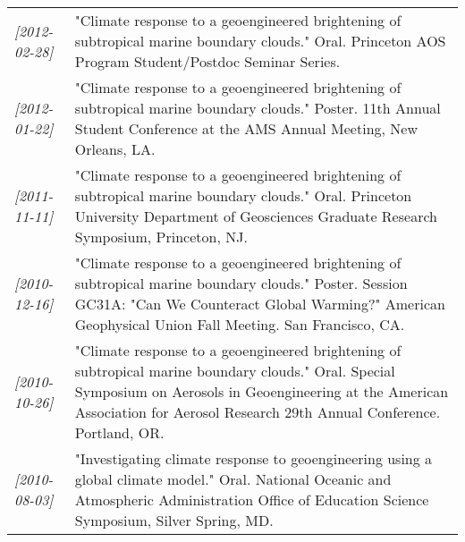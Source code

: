\documentclass{article}
\begin{document}
\begin{center}
\begin{tabularx}{\textwidth}{lX}
\textit{[2012-02-28]} & "Climate response to a geoengineered brightening of subtropical marine boundary clouds."  Oral.  Princeton AOS Program Student/Postdoc Seminar Series.\\
\textit{[2012-01-22]} & "Climate response to a geoengineered brightening of subtropical marine boundary clouds."  Poster.  11th Annual Student Conference at the AMS Annual Meeting, New Orleans, LA.\\
\textit{[2011-11-11]} & "Climate response to a geoengineered brightening of subtropical marine boundary clouds."  Oral.  Princeton University Department of Geosciences Graduate Research Symposium, Princeton, NJ.\\
\textit{[2010-12-16]} & "Climate response to a geoengineered brightening of subtropical marine boundary clouds."  Poster.  Session GC31A: "Can We Counteract Global Warming?" American Geophysical Union Fall Meeting.  San Francisco, CA.\\
\textit{[2010-10-26]} & "Climate response to a geoengineered brightening of subtropical marine boundary clouds."  Oral.  Special Symposium on Aerosols in Geoengineering at the American Association for Aerosol Research 29th Annual Conference.  Portland, OR.\\
\textit{[2010-08-03]} & "Investigating climate response to geoengineering using a global climate model."  Oral.  National Oceanic and Atmospheric Administration Office of Education Science Symposium, Silver Spring, MD.\\
\end{tabularx}
\end{center}
\end{document}
